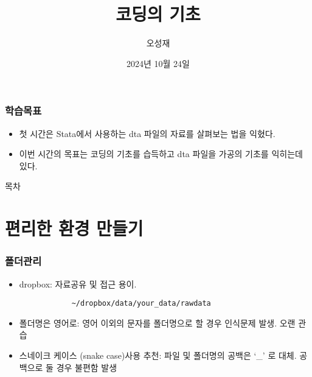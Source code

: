 \documentclass[aspectratio=169,xcolor=dvipsnames,handout]{beamer}
\title{코딩의 기초}
\author{오성재}
\institute[CNU]
{\relax
    전북대학교 Stata 특강\
}
\date{2024년 10월 24일}
\begin{document}

\frame{\titlepage}

\begin{frame}
\frametitle{학습목표}
    \begin{itemize}[<+->]
    \item 첫 시간은 Stata에서 사용하는 dta 파일의 자료를 살펴보는 법을 익혔다.
    \item 이번 시간의 목표는 코딩의 기초를 습득하고 dta 파일을 가공의 기초를 익히는데 있다.
    \end{itemize}
\end{frame}

\begin{frame}{목차}
    \small
    \tableofcontents[hideallsubsections]
\end{frame}

\section{편리한 환경 만들기}

\begin{frame}[fragile]
    \frametitle{폴더관리}
    \begin{itemize}[<+->]
        \item dropbox: 자료공유 및 접근 용이.
        \begin{verbatim}
            ~/dropbox/data/your_data/rawdata
        \end{verbatim}
        \item 폴더명은 영어로: 영어 이외의 문자를 폴더명으로 할 경우 인식문제 발생. 오랜 관습
        \item 스네이크 케이스 (snake case)사용 추천: 파일 및 폴더명의 공백은 `\_' 로 대체. 공백으로 둘 경우 불편함 발생
    \end{itemize}
\end{frame}
\end{document}
